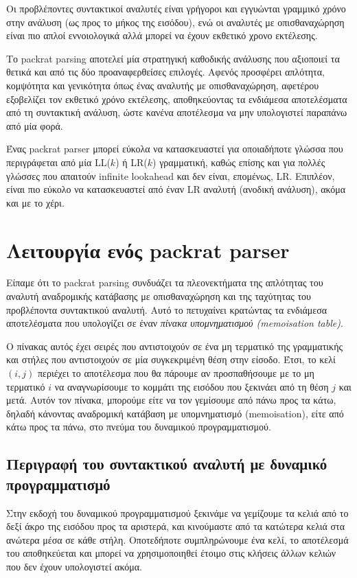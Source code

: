 Οι προβλέποντες συντακτικοί αναλυτές είναι γρήγοροι και εγγυώνται γραμμικό χρόνο στην ανάλυση (ως προς το μήκος της εισόδου), ενώ οι αναλυτές με οπισθαναχώρηση είναι πιο απλοί εννοιολογικά αλλά μπορεί να έχουν εκθετικό χρονο εκτέλεσης.

Το packrat parsing αποτελεί μία στρατηγική καθοδικής ανάλυσης που αξιοποιεί τα θετικά και από τις δύο προαναφερθείσες επιλογές. 
Αφενός προσφέρει απλότητα, κομψότητα και γενικότητα όπως ένας αναλυτής με οπισθαναχώρηση, αφετέρου εξοβελίζει τον εκθετικό χρόνο εκτέλεσης, αποθηκεύοντας τα ενδιάμεσα αποτελέσματα από τη συντακτική ανάλυση, ώστε κανένα αποτέλεσμα να μην υπολογιστεί παραπάνω από μία φορά.

Ένας packrat parser μπορεί εύκολα να κατασκευαστεί για οποιαδήποτε γλώσσα που περιγράφεται από μία LL($k$) ή LR($k$) γραμματική, καθώς επίσης και για πολλές γλώσσες που απαιτούν infinite lookahead και δεν είναι, επομένως, LR.
Επιπλέον, είναι πιο εύκολο να κατασκευαστεί από έναν LR αναλυτή (ανοδική ανάλυση), ακόμα και με το χέρι.

\section{Λειτουργία ενός packrat parser}

Είπαμε ότι το packrat parsing συνδυάζει τα πλεονεκτήματα της απλότητας του αναλυτή αναδρομικής κατάβασης με οπισθαναχώρηση και της ταχύτητας του προβλέποντα συντακτικού αναλυτή. 
Αυτό το πετυχαίνει κρατώντας τα ενδιάμεσα αποτελέσματα που υπολογίζει σε έναν \textit{πίνακα υπομνηματισμού (memoisation table)}.

Ο πίνακας αυτός έχει σειρές που αντιστοιχούν σε ένα μη τερματικό της γραμματικής και στήλες που αντιστοιχούν σε μία συγκεκριμένη θέση στην είσοδο. Έτσι, το κελί $(i, j)$ περιέχει το αποτέλεσμα που θα πάρουμε αν προσπαθήσουμε με το μη τερματικό $i$ να αναγνωρίσουμε το κομμάτι της εισόδου που ξεκινάει από τη θέση $j$ και μετά. 
Αυτόν τον πίνακα, μπορούμε είτε να τον γεμίσουμε από πάνω προς τα κάτω, δηλαδή κάνοντας αναδρομική κατάβαση με υπομνηματισμό (memoisation), είτε από κάτω προς τα πάνω, στο πνεύμα του δυναμικού προγραμματισμού.

\subsection{Περιγραφή του συντακτικού αναλυτή με δυναμικό προγραμματισμό}

Στην εκδοχή του δυναμικού προγραμματισμού ξεκινάμε να γεμίζουμε τα κελιά από το δεξί άκρο της εισόδου προς τα αριστερά, και κινούμαστε από τα κατώτερα κελιά στα ανώτερα μέσα σε κάθε στήλη. 
Οποτεδήποτε συμπληρώνουμε ένα κελί, το αποτέλεσμά του αποθηκεύεται και μπορεί να χρησιμοποιηθεί έτοιμο στις κλήσεις άλλων κελιών που δεν έχουν υπολογιστεί ακόμα.

